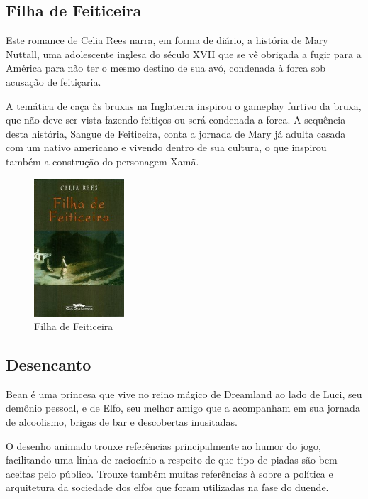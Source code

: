 \clearpage

\subsection{Filha de Feiticeira}

Este romance de Celia Rees narra, em forma de diário, a história de Mary Nuttall, uma adolescente inglesa do século XVII que se vê obrigada a fugir para a América para não ter o mesmo destino de sua avó, condenada à forca sob acusação de feitiçaria.

A temática de caça às bruxas na Inglaterra inspirou o gameplay furtivo da bruxa, que não deve ser vista fazendo feitiços ou será condenada a forca.
A sequência desta história, Sangue de Feiticeira, conta a jornada de Mary já adulta casada com um nativo americano e vivendo dentro de sua cultura, o que inspirou também a construção do personagem Xamã.

\begin{figure}[!htb] \caption{\label{filha_feiticeira}Filha de Feiticeira}
    \begin{center}
    \includegraphics[width=0.3\textwidth]{imagens/feiticeira.jpeg} \end{center}
 \end{figure}

\clearpage

\subsection{Desencanto}

Bean é uma princesa que vive no reino mágico de Dreamland ao lado de Luci, seu demônio pessoal, e de Elfo, seu melhor amigo que a acompanham em sua jornada de alcoolismo, brigas de bar e descobertas inusitadas.

O desenho animado trouxe referências principalmente ao humor do jogo, facilitando uma linha de raciocínio a respeito de que tipo de piadas são bem aceitas pelo público. Trouxe também muitas referências à sobre a política e arquitetura da sociedade dos elfos que foram utilizadas na fase do duende.



